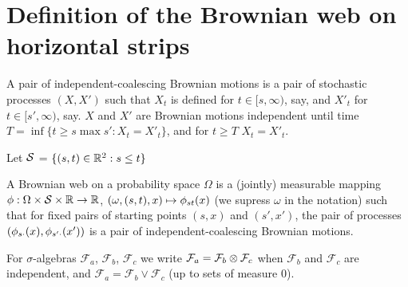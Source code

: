{
\section{Definition of the Brownian web on horizontal strips}

\begin{definition}
  \label{def:independent-coalescing-bm}
  A pair of independent-coalescing Brownian motions is a pair of
  stochastic processes $(X, X')$ such that $X_t$ is defined for $t \in
  [s, \infty)$, say, and $X'_t$ for $t \in [s', \infty)$, say.  $X$
      and $X'$ are Brownian motions independent until time $T = \inf
      \{ t \ge s \max s' : X_t = X'_t\}$, and for $t \ge T$ $X_t =
      X'_t$.
\end{definition}

\begin{notation}
  Let $\mathcal{S}$ = $\{(s, t) \in \mathbb{R}^2 : s \le t\}$
\end{notation}

\begin{definition}
  A Brownian web on a probability space $\Omega$ is a
  (jointly) measurable mapping $\phi : \Omega \times \mathcal{S} \times
  \mathbb{R} \to \mathbb{R}$, $(\omega, (s, t), x) \mapsto \phi_{{s}{t}}(x)$ (we supress
  $\omega$ in the notation) such that for fixed pairs of starting
  points $(s, x)$ and $(s', x')$, the pair of processes $(\phi_{{s}{\cdot}}(x), \phi_{{s'}{\cdot}}(x'))$ is a pair of independent-coalescing
  Brownian motions.
\end{definition}

\begin{notation}
  \newcommand{\F}{\mathcal{F}}

  For $\sigma$-algebras $\F_a$, $\F_b$, $\F_c$ we write $\F_a = \F_b
  \tensor \F_c$ when $\F_b$ and $\F_c$ are independent, and $\F_a =
  \F_b \vee \F_c$ (up to sets of measure $0$).

\end{notation}

}
